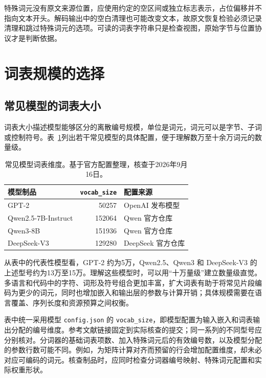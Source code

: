 \documentclass[../textbook.tex]{subfiles}
\begin{document}
特殊词元没有原文来源位置，应使用约定的空区间或独立标志表示，占位偏移并不指向文本开头。解码输出中的空白清理也可能改变文本，故原文恢复检验必须记录清理和跳过特殊词元的选项。可读的词表字符串只是检查视图，原始字节与位置协议才是判断依据。

\section{词表规模的选择}

\subsection{常见模型的词表大小}
词表大小描述模型能够区分的离散编号规模，单位是词元，词元可以是字节、子词或控制符号。表~\ref{tab:tokenizer-vocabulary-sizes}列出若干常见模型的具体配置，便于理解数万至十余万词元的数量级。

\begin{table}[htbp]
\centering
\caption[常见模型词表维度]{常见模型词表维度。基于官方配置整理，核查于2026年9月16日。}\label{tab:tokenizer-vocabulary-sizes}
\begin{tabularx}{\linewidth}{XrX}
\toprule
模型制品 & \texttt{vocab\_size} & 配置来源\\
\midrule
GPT-2 & \num{50257} & OpenAI 发布模型\cite{gpt2Config2026}\\
Qwen2.5-7B-Instruct & \num{152064} & Qwen 官方仓库\cite{qwen25Config2026}\\
Qwen3-8B & \num{151936} & Qwen 官方仓库\cite{qwen3Config2026}\\
DeepSeek-V3 & \num{129280} & DeepSeek 官方仓库\cite{deepseekv3Config2026}\\
\bottomrule
\end{tabularx}
\end{table}

从表中的代表性模型看，GPT-2 约为5万，Qwen2.5、Qwen3 和 DeepSeek-V3 的上述型号约为13万至15万。理解这些模型时，可以用“十万量级”建立数量级直觉。多语言和代码中的字符、词形及符号组合更加丰富，扩大词表有助于将常见片段编码为更少的词元，同时也增加嵌入和输出层的参数与计算开销；具体规模需要在语言覆盖、序列长度和资源预算之间权衡。

表中统一采用模型 \texttt{config.json} 的 \texttt{vocab\_size}，即模型配置为输入嵌入和词表输出分配的编号维度。参考文献链接固定到实际核查的提交；同一系列的不同型号应分别核对。分词器的基础词表项数、加入特殊词元后的有效编号数，以及模型分配的参数行数可能不同。例如，为矩阵计算对齐而预留的行会增加配置维度，却未必对应可编码的词元。核查制品时，应同时检查分词器编号映射、特殊词元配置和实际权重形状。
\end{document}
